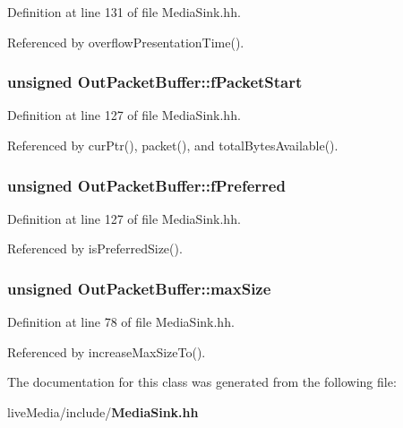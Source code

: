 Definition at line 131 of file Media\+Sink.\+hh.



Referenced by overflow\+Presentation\+Time().

\subsubsection[{f\+Packet\+Start}]{\setlength{\rightskip}{0pt plus 5cm}unsigned Out\+Packet\+Buffer\+::f\+Packet\+Start\hspace{0.3cm}{\ttfamily [private]}}\label{classOutPacketBuffer_a178289e7df882e3223ebd939199b024a}


Definition at line 127 of file Media\+Sink.\+hh.



Referenced by cur\+Ptr(), packet(), and total\+Bytes\+Available().

\subsubsection[{f\+Preferred}]{\setlength{\rightskip}{0pt plus 5cm}unsigned Out\+Packet\+Buffer\+::f\+Preferred\hspace{0.3cm}{\ttfamily [private]}}\label{classOutPacketBuffer_a68c2946fda68e0200ecab2f80f0297ea}


Definition at line 127 of file Media\+Sink.\+hh.



Referenced by is\+Preferred\+Size().

\subsubsection[{max\+Size}]{\setlength{\rightskip}{0pt plus 5cm}unsigned Out\+Packet\+Buffer\+::max\+Size\hspace{0.3cm}{\ttfamily [static]}}\label{classOutPacketBuffer_a27f745b288df55bbfb39a7564fe40596}


Definition at line 78 of file Media\+Sink.\+hh.



Referenced by increase\+Max\+Size\+To().



The documentation for this class was generated from the following file\+:\begin{DoxyCompactItemize}
\item 
live\+Media/include/{\bf Media\+Sink.\+hh}\end{DoxyCompactItemize}
